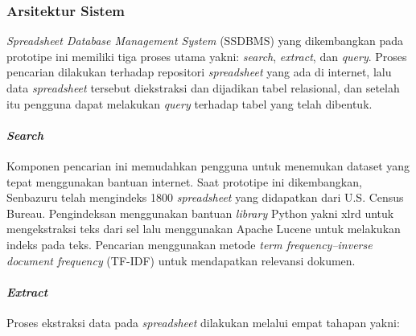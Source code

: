     \subsubsection{Arsitektur Sistem}

    \textit{Spreadsheet Database Management System} (SSDBMS) yang dikembangkan pada prototipe ini memiliki tiga proses utama yakni: \textit{search}, \textit{extract}, dan \textit{query}. Proses pencarian dilakukan terhadap repositori \textit{spreadsheet} yang ada di internet, lalu data \textit{spreadsheet} tersebut diekstraksi dan dijadikan tabel relasional, dan setelah itu pengguna dapat melakukan \textit{query} terhadap tabel yang telah dibentuk.

        \paragraph{\textit{Search}}
        Komponen pencarian ini memudahkan pengguna untuk menemukan dataset yang tepat menggunakan bantuan internet. Saat prototipe ini dikembangkan, Senbazuru telah mengindeks 1800 \textit{spreadsheet} yang didapatkan dari U.S. Census Bureau. Pengindeksan menggunakan bantuan \textit{library} Python yakni xlrd untuk mengekstraksi teks dari sel lalu menggunakan Apache Lucene untuk melakukan indeks pada teks. Pencarian menggunakan metode \textit{term frequency–inverse document frequency} (TF-IDF) untuk mendapatkan relevansi dokumen.
        
        \paragraph{\textit{Extract}}
        Proses ekstraksi data pada \textit{spreadsheet} dilakukan melalui empat tahapan yakni:

